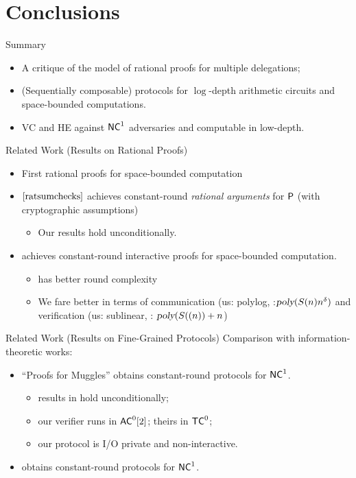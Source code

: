 \section{Conclusions}

\begin{frame}{Summary}
		\begin{itemize}[<+- | alert@+>]	
			\item A critique of the model of rational proofs for multiple delegations;
			\item (Sequentially composable) protocols for $\log$-depth arithmetic circuits and space-bounded computations.
			\item VC and HE against $\NC^1$ adversaries and computable in low-depth.
		\end{itemize}
\end{frame}

\begin{frame}{Related Work (Results on Rational Proofs)}
\begin{itemize}[<+- | alert@+>]
	\item First rational proofs for space-bounded computation
	\item $\cite{ratsumchecks}$ achieves constant-round \textit{rational arguments} for $\P$ (with cryptographic assumptions)
	\begin{itemize}
		\item Our results hold unconditionally.
	\end{itemize}
	\item \cite{rrr16} achieves constant-round interactive proofs for space-bounded computation.
	\begin{itemize}
		\item \cite{rrr16} has better round complexity
		\item We fare better in terms of communication (us: polylog, \cite{rrr16}:$\poly(S(n)n^{\delta})$ and verification (us: sublinear, \cite{rrr16}: $\poly(S((n)) + n$)
	\end{itemize}
\end{itemize}
\end{frame}


\begin{frame}{Related Work (Results on Fine-Grained Protocols)}
	Comparison with information-theoretic works:
	\begin{itemize}[<+- | alert@+>]
		\item ``Proofs for Muggles'' \cite{muggles} obtains constant-round protocols for $\NC^1$.
		\begin{itemize}
			\item results in \cite{muggles} hold unconditionally; 
			\item our verifier runs in $\ACzt$; theirs in $\TC^0$;
			\item our protocol is I/O private and non-interactive.
		\end{itemize}
		\item \cite{gghkr07} obtains constant-round protocols for $\NC^1$.
	\end{itemize}
\end{frame}

